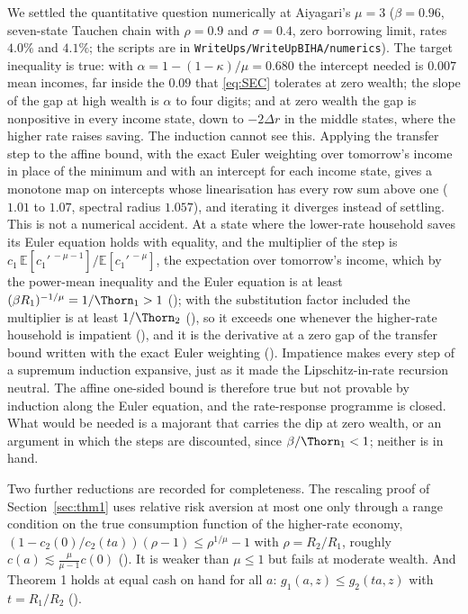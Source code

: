 We settled the quantitative question numerically at Aiyagari's $\mu=3$ ($\beta=0.96$, seven-state
Tauchen chain with $\rho=0.9$ and $\sigma=0.4$, zero borrowing limit, rates $4.0\%$ and $4.1\%$;
the scripts are in \texttt{WriteUps/\allowbreak WriteUpBIHA/\allowbreak numerics}). The target inequality is true:
with $\alpha=1-(1-\kappa)/\mu=0.680$ the intercept needed is $0.007$ mean incomes, far inside the
$0.09$ that \eqref{eq:SEC} tolerates at zero wealth; the slope of the gap at high wealth is
$\alpha$ to four digits; and at zero wealth the gap is nonpositive in every income state, down to
$-2\Delta r$ in the middle states, where the higher rate raises saving. The induction cannot see
this. Applying the transfer step to the affine bound, with the exact Euler weighting over
tomorrow's income in place of the minimum and with an intercept for each income state, gives a
monotone map on intercepts whose linearisation has every row sum above one ($1.01$ to $1.07$,
spectral radius $1.057$), and iterating it diverges instead of settling. This is not a numerical
accident. At a state where the lower-rate household saves its Euler equation holds with equality,
and the multiplier of the step is $c_1\,\mathbb{E}[c_1'^{\,-\mu-1}]/\mathbb{E}[c_1'^{\,-\mu}]$,
the expectation over tomorrow's income, which by the power-mean inequality and the Euler equation
is at least $(\beta R_1)^{-1/\mu}=1/\Thorn_1>1$ (); with the
substitution factor included the multiplier is at least $1/\Thorn_2$
(), so it exceeds one whenever the higher-rate household is
impatient (), and it is the derivative at a zero gap of the
transfer bound written with the exact Euler weighting ().
Impatience makes every step of a supremum induction expansive, just as it made the
Lipschitz-in-rate recursion neutral. The affine one-sided bound is therefore true but not
provable by induction along the Euler equation, and the rate-response programme is closed. What
would be needed is a majorant that carries the dip at zero wealth, or an argument in which the
steps are discounted, since $\beta/\Thorn_1<1$; neither is in hand.

Two further reductions are recorded for completeness. The rescaling proof of Section~\ref{sec:thm1}
uses relative risk aversion at most one only through a range condition on the true consumption
function of the higher-rate economy, $(1-c_2(0)/c_2(ta))(\rho-1)\le\rho^{1/\mu}-1$ with
$\rho=R_2/R_1$, roughly $c(a)\lesssim\frac{\mu}{\mu-1}c(0)$ ().
It is weaker than $\mu\le1$ but fails at moderate wealth. And Theorem 1 holds at equal cash on
hand for all $a$: $g_1(a,z)\le g_2(ta,z)$ with $t=R_1/R_2$ ().

